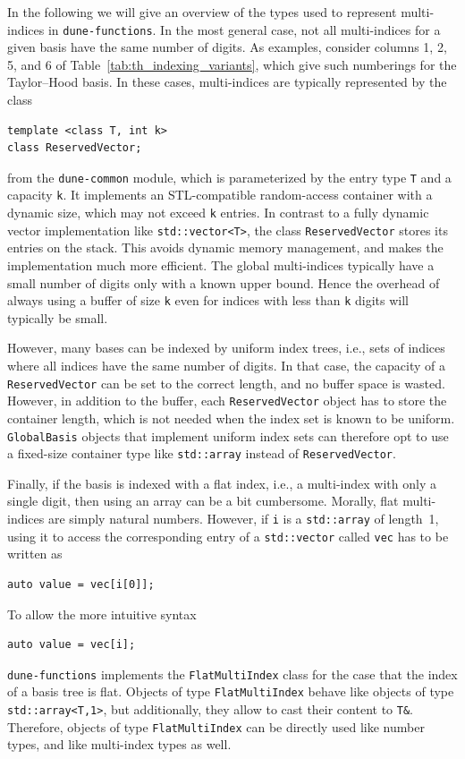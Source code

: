 \documentclass[a4paper,10pt,headings=normal,bibliography=totoc]{scrartcl}
\newcommand{\cpp}[1]{\lstinline[basicstyle=\ttfamily]!#1!}
\newcommand{\dunemodule}[1]{\texttt{#1}}
\begin{document}
In the following we will
give an overview of the types used to represent multi-indices
in \dunemodule{dune-functions}.
In the most general case, not all multi-indices for a given basis have
the same number of digits.  As examples, consider columns 1, 2, 5, and 6
of Table~\ref{tab:th_indexing_variants}, which give such numberings for the Taylor--Hood basis.
In these cases, multi-indices are typically represented
by the class
\begin{lstlisting}[style=Interface]
template <class T, int k>
class ReservedVector;
\end{lstlisting}
from the \dunemodule{dune-common} module, which is parameterized
by the entry type \cpp{T} and a capacity \cpp{k}.
It implements an STL-compatible random-access container with a dynamic size,
which may not exceed \cpp{k} entries.
In contrast to a fully dynamic vector implementation
like \cpp{std::vector<T>}, the class \cpp{ReservedVector} stores its entries
on the stack.  This avoids dynamic memory management, and makes the
implementation much more efficient. The global multi-indices typically have
a small number of digits only with a known upper bound.
Hence the overhead of always using a buffer of size \cpp{k} even
for indices with less than \cpp{k} digits will typically be small.

However, many bases can be indexed by uniform index trees, i.e., sets of indices where
all indices have the same number of digits.  In that case, the capacity of a
\cpp{ReservedVector} can be set to the correct length, and no buffer space is wasted.
However, in addition to the buffer, each \cpp{ReservedVector} object has to store
the container length, which is not needed when the index set is known to be uniform.
\cpp{GlobalBasis} objects that implement uniform index sets can therefore
opt to use a fixed-size container type like \cpp{std::array} instead of
\cpp{ReservedVector}.

Finally, if the basis is indexed with a flat index, i.e., a multi-index with only a single digit,
then using an array can be a bit cumbersome.  Morally, flat multi-indices
are simply natural numbers.  However, if \cpp{i} is a \cpp{std::array} of length~1,
using it to access the corresponding entry of a \cpp{std::vector} called \cpp{vec} has to be
written as
\begin{lstlisting}
auto value = vec[i[0]];
\end{lstlisting}
To allow the more intuitive syntax
\begin{lstlisting}
auto value = vec[i];
\end{lstlisting}
\dunemodule{dune-functions} implements the \cpp{FlatMultiIndex} class for the
case that the index
of a basis tree is flat.  Objects of type \cpp{FlatMultiIndex}
behave like objects of type \cpp{std::array<T,1>}, but additionally, they allow to cast
their content to \cpp{T&}.  Therefore, objects of type \cpp{FlatMultiIndex} can be directly used
like number types, and like multi-index types as well.
\end{document}
